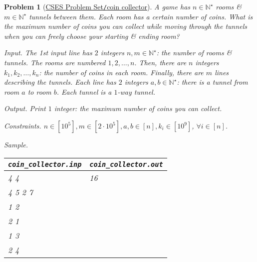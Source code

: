 \documentclass{article}
\newtheorem{problem}{Problem}
\begin{document}
\begin{problem}[\href{https://cses.fi/problemset/task/1686}{CSES Problem Set{\tt/}coin collector}]
    A game has $n\in\mathbb{N}^\star$ rooms \& $m\in\mathbb{N}^\star$ tunnels between them. Each room has a certain number of coins. What is the maximum number of coins you can collect while moving through the tunnels when you can freely choose your starting \& ending room?
    \item {\sf Input.} The 1st input line has $2$ integers $n,m\in\mathbb{N}^\star$: the number of rooms \& tunnels. The rooms are numbered $1,2,\ldots,n$. Then, there are $n$ integers $k_1,k_2,\ldots,k_n$: the number of coins in each room. Finally, there are $m$ lines describing the tunnels. Each line has $2$ integers $a,b\in\mathbb{N}^\star$: there is a tunnel from room $a$ to room $b$. Each tunnel is a $1$-way tunnel.
    \item {\sf Output.} Print $1$ integer: the maximum number of coins you can collect.
    \item {\sf Constraints.} $n\in[10^5],m\in[2\cdot10^5],a,b\in[n],k_i\in[10^9]$, $\forall i\in[n]$.
    \item {\sf Sample.}
    \begin{table}[H]
        \centering
        \begin{tabular}{|l|l|}
            \hline
            \verb|coin_collector.inp| & \verb|coin_collector.out| \\
            \hline
            4 4 & 16 \\
            4 5 2 7 & \\
            1 2 & \\
            2 1 & \\
            1 3 & \\
            2 4 & \\
            \hline
        \end{tabular}
    \end{table}
\end{problem}
\end{document}
